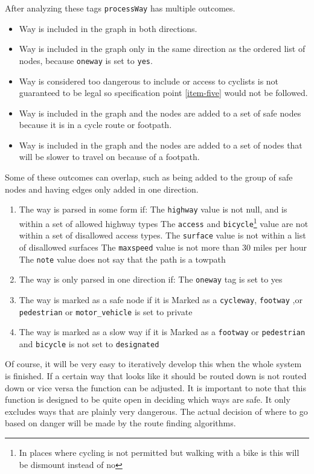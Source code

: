 \documentclass[11pt,twoside,a4paper]{article}
\begin{document}
After analyzing these tags \texttt{processWay} has multiple outcomes.
\begin{itemize}
    \item Way is included in the graph in both directions.
    \item Way is included in the graph only in the same direction as the ordered list of nodes, because \texttt{oneway} is set to \texttt{yes}.
    \item Way is considered too dangerous to include or access to cyclists is not guaranteed to be legal so specification point \ref{item-five} would not be followed.
    \item Way is included in the graph and the nodes are added to a set of safe nodes because it is in a cycle route or footpath.
    \item Way is included in the graph and the nodes are added to a set of nodes that will be slower to travel on because of a footpath.
\end{itemize}
Some of these outcomes can overlap, such as being added to the group of safe nodes and having edges only added in one direction.\\
\begin{enumerate}
    \item The way is parsed in some form if:
    \subitem The \texttt{highway} value is not null, and is within a set of allowed highway types
    \subitem The \texttt{access} and \texttt{bicycle}\footnote{In places where cycling is not permitted but walking with a bike is this will be dismount instead of no} value are not within a set of disallowed access types.
    \subitem The \texttt{surface} value is not within a list of disallowed surfaces
    \subitem The \texttt{maxspeed} value is not more than 30 miles per hour
    \subitem The \texttt{note} value does not say that the path is a towpath
    \item The way is only parsed in one direction if:
    \subitem The \texttt{oneway} tag is set to yes
    \item The way is marked as a safe node if it is
    \subitem Marked as a \texttt{cycleway}, \texttt{footway} ,or \texttt{pedestrian} or \texttt{motor\_vehicle} is set to private
    \item The way is marked as a slow way if it is 
    \subitem Marked as a \texttt{footway} or \texttt{pedestrian} and \texttt{bicycle} is not set to \texttt{designated}
\end{enumerate}
Of course, it will be very easy to iteratively develop this when the whole system is finished. If a certain way that looks like it should be routed down is not routed down or vice versa the function can be adjusted.
It is important to note that this function is designed to be quite open in deciding which ways are safe. It only excludes ways that are plainly very dangerous. The actual decision of where to go based on danger will be made by the
route finding algorithms.
\newpage
\end{document}
